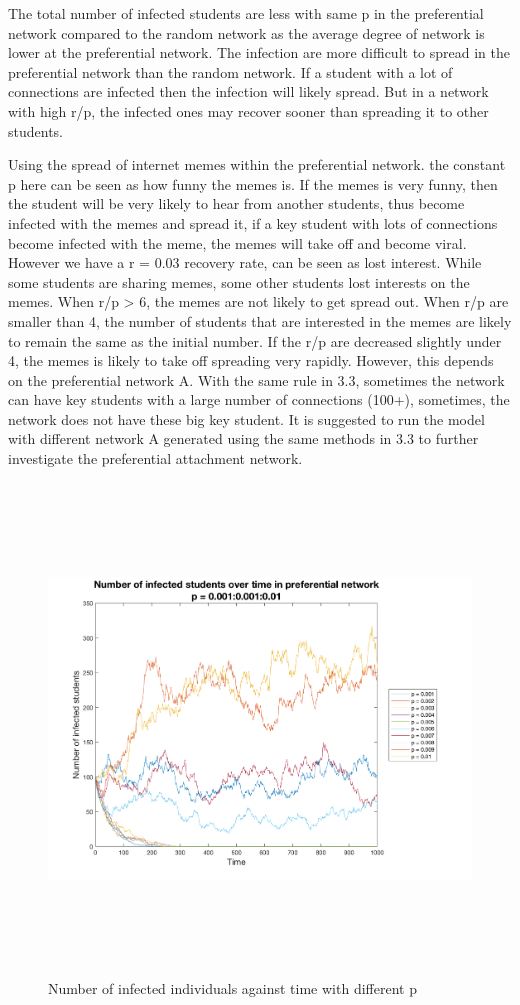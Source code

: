 \documentclass[12pt]{article}
\begin{document}
The total number of infected students are less with same p in the preferential network compared to the random network as the average degree of network is lower at the preferential network. The infection are more difficult to spread in the preferential network than the random network. If a student with a lot of connections are infected then the infection will likely spread. But in a network with high r/p, the infected ones may recover sooner than spreading it to other students. \par

Using the spread of internet memes within the preferential network. the constant p here can be seen as how funny the memes is. If the memes is very funny, then the student will be very likely to hear from another students, thus become infected with the memes and spread it, if a key student with lots of connections become infected with the meme, the memes will take off and become viral. However we have a r = 0.03 recovery rate, can be seen as lost interest. While some students are sharing memes, some other students lost interests on the memes. When r/p > 6, the memes are not likely to get spread out. When r/p are smaller than 4, the number of students that are interested in the memes are likely to remain the same as the initial number. If the r/p are decreased slightly under 4, the memes is likely to take off spreading very rapidly. However, this depends on the preferential network A. With the same rule in 3.3, sometimes the network can have key students with a large number of connections (100+), sometimes, the network does not have these big key student. It is suggested to run the model with different network A generated using the same methods in 3.3 to further investigate the preferential attachment network.  


\begin{figure}[H] %
\centering
\includegraphics[width = 16 cm, height = 13cm]{pnwinf.png}
\caption{Number of infected individuals against time with different p}
\label{fig:pnwinf}
\end{figure}
\end{document}
